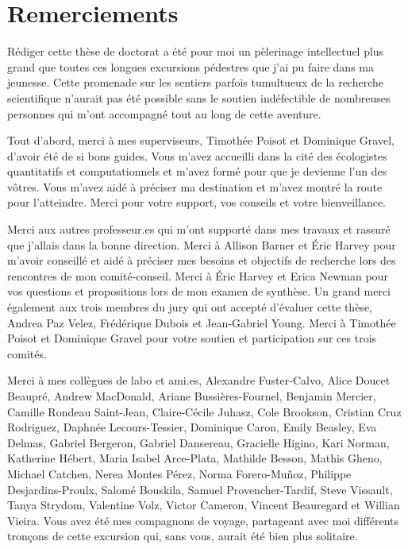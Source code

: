 \documentclass[12pt,twoside,phd]{dms}
\numberwithin{equation}{section}
\numberwithin{table}{chapter}
\numberwithin{figure}{chapter}
\begin{document}
\setlength{\parskip}{6pt} %

\chapter*{Remerciements}

Rédiger cette thèse de doctorat a été pour moi un pèlerinage intellectuel plus
grand que toutes ces longues excursions pédestres que j'ai pu faire dans ma
jeunesse. Cette promenade sur les sentiers parfois tumultueux de la recherche
scientifique n'aurait pas été possible sans le soutien indéfectible de
nombreuses personnes qui m'ont accompagné tout au long de cette aventure.

Tout d'abord, merci à mes superviseurs, Timothée Poisot et Dominique Gravel,
d'avoir été de si bons guides. Vous m'avez accueilli dans la cité des
écologistes quantitatifs et computationnels et m'avez formé pour que je devienne
l'un des vôtres. Vous m'avez aidé à préciser ma destination et m'avez montré la
route pour l'atteindre. Merci pour votre support, vos conseils et votre
bienveillance.

Merci aux autres professeur.es qui m'ont supporté dans mes travaux et rassuré
que j'allais dans la bonne direction. Merci à Allison Barner et Éric Harvey pour
m'avoir conseillé et aidé à préciser mes besoins et objectifs de recherche lors
des rencontres de mon comité-conseil. Merci à Éric Harvey et Erica Newman pour
vos questions et propositions lors de mon examen de synthèse. Un grand merci
également aux trois membres du jury qui ont accepté d'évaluer cette thèse,
Andrea Paz Velez, Frédérique Dubois et Jean-Gabriel Young. Merci à Timothée
Poisot et Dominique Gravel pour votre soutien et participation sur ces trois
comités.

Merci à mes collègues de labo et ami.es, Alexandre Fuster-Calvo, Alice Doucet
Beaupré, Andrew MacDonald, Ariane Bussières-Fournel, Benjamin Mercier, Camille
Rondeau Saint-Jean, Claire-Cécile Juhasz, Cole Brookson, Cristian Cruz
Rodriguez, Daphnée Lecours-Tessier, Dominique Caron, Emily Beasley, Eva Delmas,
Gabriel Bergeron, Gabriel Dansereau, Gracielle Higino, Kari Norman, Katherine
Hébert, Maria Isabel Arce-Plata, Mathilde Besson, Mathis Gheno, Michael Catchen,
Nerea Montes Pérez, Norma Forero-Muñoz, Philippe Desjardins-Proulx, Salomé
Bouskila, Samuel Provencher-Tardif, Steve Vissault, Tanya Strydom, Valentine
Volz, Victor Cameron, Vincent Beauregard et Willian Vieira. Vous avez été mes
compagnons de voyage, partageant avec moi différents tronçons de cette excursion
qui, sans vous, aurait été bien plus solitaire. 
\end{document}
